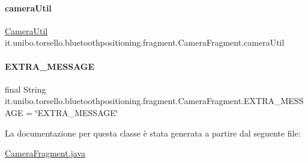 \paragraph{\texorpdfstring{camera\+Util}{cameraUtil}}
{\footnotesize\ttfamily \hyperlink{classit_1_1unibo_1_1torsello_1_1bluetoothpositioning_1_1util_1_1CameraUtil}{Camera\+Util} it.\+unibo.\+torsello.\+bluetoothpositioning.\+fragment.\+Camera\+Fragment.\+camera\+Util\hspace{0.3cm}{\ttfamily [private]}}

\hypertarget{classit_1_1unibo_1_1torsello_1_1bluetoothpositioning_1_1fragment_1_1CameraFragment_abdda7813302f466435cedfb3641e45b9_abdda7813302f466435cedfb3641e45b9}{}\label{classit_1_1unibo_1_1torsello_1_1bluetoothpositioning_1_1fragment_1_1CameraFragment_abdda7813302f466435cedfb3641e45b9_abdda7813302f466435cedfb3641e45b9} 
\paragraph{\texorpdfstring{E\+X\+T\+R\+A\+\_\+\+M\+E\+S\+S\+A\+GE}{EXTRA\_MESSAGE}}
{\footnotesize\ttfamily final String it.\+unibo.\+torsello.\+bluetoothpositioning.\+fragment.\+Camera\+Fragment.\+E\+X\+T\+R\+A\+\_\+\+M\+E\+S\+S\+A\+GE = \char`\"{}E\+X\+T\+R\+A\+\_\+\+M\+E\+S\+S\+A\+GE\char`\"{}\hspace{0.3cm}{\ttfamily [static]}}



La documentazione per questa classe è stata generata a partire dal seguente file\+:\begin{DoxyCompactItemize}
\item 
\hyperlink{CameraFragment_8java}{Camera\+Fragment.\+java}\end{DoxyCompactItemize}
